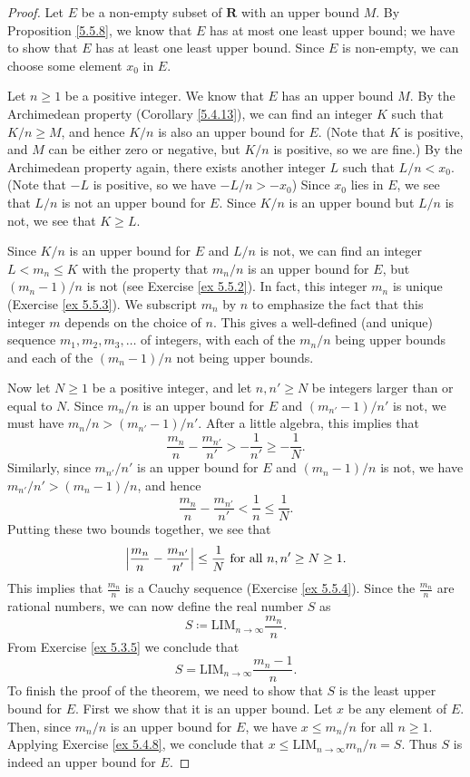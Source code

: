 \begin{proof}
Let \(E\) be a non-empty subset of \(\mathbf{R}\) with an upper bound \(M\).
By Proposition \ref{5.5.8}, we know that \(E\) has at most one least upper bound;
we have to show that \(E\) has at least one least upper bound.
Since \(E\) is non-empty, we can choose some element \(x_0\) in \(E\).

Let \(n \geq 1\) be a positive integer.
We know that \(E\) has an upper bound \(M\).
By the Archimedean property (Corollary \ref{5.4.13}), we can find an integer \(K\) such that \(K / n \geq M\), and hence \(K / n\) is also an upper bound for \(E\).
(Note that \(K\) is positive, and \(M\) can be either zero or negative, but \(K / n\) is positive, so we are fine.)
By the Archimedean property again, there exists another integer \(L\) such that \(L / n < x_0\).
(Note that \(-L\) is positive, so we have \(-L / n > -x_0\))
Since \(x_0\) lies in \(E\), we see that \(L / n\) is not an upper bound for \(E\).
Since \(K / n\) is an upper bound but \(L / n\) is not, we see that \(K \geq L\).

Since \(K / n\) is an upper bound for \(E\) and \(L / n\) is not, we can find an integer \(L < m_n \leq K\) with the property that \(m_n / n\) is an upper bound for \(E\), but \((m_n - 1) / n\) is not (see Exercise \ref{ex 5.5.2}).
In fact, this integer \(m_n\) is unique (Exercise \ref{ex 5.5.3}).
We subscript \(m_n\) by \(n\) to emphasize the fact that this integer \(m\) depends on the choice of \(n\).
This gives a well-defined (and unique) sequence \(m_1, m_2, m_3, \dots\) of integers, with each of the \(m_n / n\) being upper bounds and each of the \((m_n - 1) / n\) not being upper bounds.

Now let \(N \geq 1\) be a positive integer, and let \(n, n' \geq N\) be integers larger than or equal to \(N\).
Since \(m_n / n\) is an upper bound for \(E\) and \((m_{n'} - 1) / n'\) is not, we must have \(m_n / n > (m_{n'} - 1) / n'\).
After a little algebra, this implies that
\[
    \frac{m_n}{n} - \frac{m_{n'}}{n'} > -\frac{1}{n'} \geq -\frac{1}{N}.
\]
Similarly, since \(m_{n'} / n'\) is an upper bound for \(E\) and \((m_n - 1) / n\) is not, we have \(m_{n'} / n' > (m_n - 1) / n\), and hence
\[
    \frac{m_n}{n} - \frac{m_{n'}}{n'} < \frac{1}{n} \leq \frac{1}{N}.
\]
Putting these two bounds together, we see that
\[
    \abs*{\frac{m_n}{n} - \frac{m_{n'}}{n'}} \leq \frac{1}{N} \text{ for all } n, n' \geq N \geq 1.
\]
This implies that \(\frac{m_n}{n}\) is a Cauchy sequence (Exercise \ref{ex 5.5.4}).
Since the \(\frac{m_n}{n}\) are rational numbers, we can now define the real number \(S\) as
\[
    S \coloneqq \text{LIM}_{n \to \infty} \frac{m_n}{n}.
\]
From Exercise \ref{ex 5.3.5} we conclude that
\[
    S = \text{LIM}_{n \to \infty} \frac{m_n - 1}{n}.
\]
To finish the proof of the theorem, we need to show that \(S\) is the least upper bound for \(E\).
First we show that it is an upper bound.
Let \(x\) be any element of \(E\).
Then, since \(m_n / n\) is an upper bound for \(E\), we have \(x \leq m_n / n\) for all \(n \geq 1\).
Applying Exercise \ref{ex 5.4.8}, we conclude that \(x \leq \text{LIM}_{n \to \infty} m_n / n = S\).
Thus \(S\) is indeed an upper bound for \(E\).


\end{proof}
